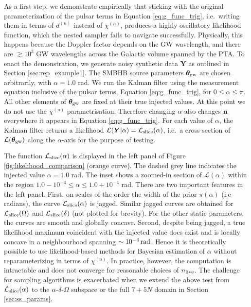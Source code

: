 \documentclass[fleqn,usenatbib,useAMS]{mnras}
\begin{document}
As a first step, we demonstrate empirically that sticking with the original parameterization of the pulsar terms in Equation \eqref{eq:g_func_trig}, i.e.\ writing them in terms of $d^{(n)}$ instead of $\chi^{(n)}$, produces a highly oscillatory likelihood function, which the nested sampler fails to navigate successfully. Physically, this happens because the Doppler factor depends on the GW wavelength, and there are $\gtrsim 10^3$ GW wavelengths across the Galactic volume spanned by the PTA. To enact the demonstration, we generate noisy synthetic data $\boldsymbol{Y}$ as outlined in Section \ref{sec:rep_example1}. The SMBHB source parameters $\boldsymbol{\theta}_{\rm gw}$ are chosen arbitrarily, with $\alpha = 1.0 $ rad. We run the Kalman filter using the measurement equation inclusive of the pulsar terms, Equation \eqref{eq:g_func_trig}, for $ 0 \le \alpha \le \pi$. All other elements of $\boldsymbol{\theta}_{\rm gw}$ are fixed at their true injected values. At this point we do not use the $\chi^{(n)}$ parametrisation. Therefore changing $\alpha$ also changes $\boldsymbol{n}$ everywhere it appears in Equation \eqref{eq:g_func_trig}. For each value of $\alpha$, the Kalman filter returns a likelihood $\mathcal{L}(\boldsymbol{Y} | \alpha) = \mathcal{L}_{\rm slice}(\alpha)$, i.e.\ a cross-section of $\mathcal {L}(\boldsymbol{\theta}_{\rm gw})$ along the $\alpha$-axis for the purpose of testing. \newline 


The function $\mathcal{L}_{\rm slice}(\alpha)$ is displayed in the left panel of Figure \ref{fig:likelihood_comparison} (orange curve). The dashed grey line indicates the injected value $\alpha= 1.0$ rad. The inset shows a zoomed-in section of $\mathcal{L}(\alpha)$ within the region $ 1.0 - 10^{-4} \le \alpha \le 1.0 +10^{-4}$ rad.  There are two important features in the left panel. First, on scales of the order the width of the prior $\pi(\alpha)$ (i.e radians), the curve $\mathcal{L}_{\rm slice}(\alpha)$ is jagged. Similar jagged curves are obtained for $\mathcal{L}_{\rm slice}(\Omega)$ and $\mathcal{L}_{\rm slice}(\delta)$ (not plotted for brevity). For the other static parameters, the curves are smooth and globally concave. Second, despite being jagged, a true likelihood maximum coincident with the injected value does exist and is locally concave in a neighbourhood spanning $\sim 10^{-4} \, {\rm rad}$. Hence it is theoretically possible to use likelihood-based methods for Bayesian estimation of $\alpha$ without reparameterizing in terms of $\chi^{(n)}$. In practice, however, the computation is intractable and does not converge for reasonable choices of $n_{\rm live}$. The challenge for sampling algorithms is exacerbated when we extend the above test from $\mathcal{L}_{\rm slice}(\alpha)$ to the $\alpha$-$\delta$-$\Omega$ subspace or the full $7 + 5N$ domain in Section \ref{sec:ss_params}. \newline 
\end{document}
